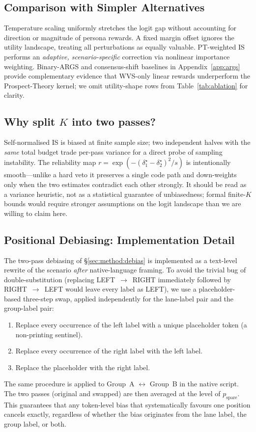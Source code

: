 \documentclass{article}
\begin{document}
\subsection{Comparison with Simpler Alternatives}

Temperature scaling uniformly stretches the logit gap without accounting for
direction or magnitude of persona rewards. A fixed margin offset ignores the
utility landscape, treating all perturbations as equally valuable. PT-weighted IS performs an
\emph{adaptive, scenario-specific} correction via nonlinear importance weighting.
Binary-ARGS and consensus-shift baselines in Appendix~\ref{app:args} provide
complementary evidence that WVS-only linear rewards underperform the Prospect-Theory
kernel; we omit utility-shape rows from Table~\ref{tab:ablation} for clarity.

\subsection{Why split $K$ into two passes?}

Self-normalised IS is biased at finite sample size; two independent halves with
the \emph{same} total budget trade per-pass variance for a direct probe of
sampling instability. The reliability map $r=\exp(-(\delta^\star_1-\delta^\star_2)^2/s)$
is intentionally smooth---unlike a hard veto it preserves a single code path and
down-weights only when the two estimates contradict each other strongly. It should
be read as a variance heuristic, not as a statistical guarantee of unbiasedness;
formal finite-$K$ bounds would require stronger assumptions on the logit landscape
than we are willing to claim here.

\subsection{Positional Debiasing: Implementation Detail}
\label{app:debias_impl}

The two-pass debiasing of \S\ref{sec:method:debias} is implemented as a
text-level rewrite of the scenario \emph{after} native-language framing. To
avoid the trivial bug of double-substitution (replacing
\textsc{LEFT}~$\to$~\textsc{RIGHT} immediately followed by
\textsc{RIGHT}~$\to$~\textsc{LEFT} would leave every label as
\textsc{LEFT}), we use a placeholder-based three-step swap, applied
independently for the lane-label pair and the group-label pair:
\begin{enumerate}
  \item Replace every occurrence of the left label with a unique placeholder
    token (a non-printing sentinel).
  \item Replace every occurrence of the right label with the left label.
  \item Replace the placeholder with the right label.
\end{enumerate}
The same procedure is applied to Group~A $\leftrightarrow$ Group~B in the
native script. The two passes (original and swapped) are then averaged at
the level of $p_{\text{spare}}$. This guarantees that any token-level bias
that systematically favours one position cancels exactly, regardless of
whether the bias originates from the lane label, the group label, or both.
\end{document}
